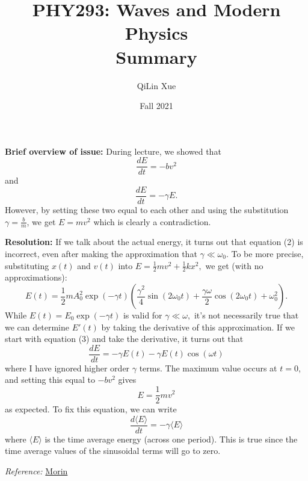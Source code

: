 \documentclass{article}
\title{PHY293: Waves and Modern Physics \\ \textbf{Summary}}
\author{QiLin Xue}
\date{Fall 2021}
\begin{document}
\textbf{Brief overview of issue:} During lecture, we showed that
\begin{equation}
    \frac{dE}{dt} = -bv^2
\end{equation}
and 
\begin{equation}
    \frac{dE}{dt} = -\gamma E.
\end{equation}
However, by setting these two equal to each other and using the substitution $\gamma = \frac{b}{m}$, we get $E = mv^2$ which is clearly a contradiction.

\textbf{Resolution:} If we talk about the actual energy, it turns out that equation (2) is incorrect, even after making the approximation that $\gamma \ll \omega_0.$ To be more precise, substituting $x(t)$ and $v(t)$ into $E=\frac{1}{2}mv^2+\frac{1}{2}kx^2,$ we get (with no approximations):
\begin{equation}
    E(t) = \frac{1}{2}mA_0^2\exp\left(-\gamma t\right)\left(\frac{\gamma^2}{4}\sin(2\omega_0t)+\frac{\gamma \omega}{2}\cos(2\omega_0t)+\omega_0^2\right).
\end{equation} 
While $E(t) = E_0\exp(-\gamma t)$ is valid for $\gamma \ll \omega,$ it's not necessarily true that we can determine $E'(t)$ by taking the derivative of this approximation. If we start with equation (3) and take the derivative, it turns out that
\begin{equation}
    \frac{dE}{dt} = -\gamma E(t) - \gamma E(t)\cos(\omega t)
\end{equation}
where I have ignored higher order $\gamma$ terms. The maximum value occurs at $t=0$, and setting this equal to $-bv^2$ gives 
\begin{equation}
    E = \frac{1}{2}mv^2
\end{equation}
as expected. To fix this equation, we can write 
\begin{equation}
    \boxed{\frac{d\langle E \rangle}{dt} = -\gamma \langle E\rangle}
\end{equation}
where $\langle E\rangle$ is the time average energy (across one period). This is true since the time average values of the sinusoidal terms will go to zero.

\textit{Reference:} \href{https://scholar.harvard.edu/files/david-morin/files/waves_oscillations.pdf}{Morin}
\end{document}
